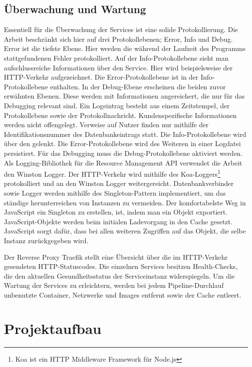 \subsection{Überwachung und Wartung}
\label{subsec:ueberwachungundwartung}
Essentiell für die Überwachung der Services ist eine solide Protokollierung.
Die Arbeit beschränkt sich hier auf drei Protokollebenen; Error, Info und Debug.
Error ist die tiefste Ebene. Hier werden die während der Laufzeit des Programms
stattgefundenen Fehler protokolliert. Auf der Info-Protokollebene sieht man
aufschlussreiche Informationen über den Service. Hier wird beispielsweise
der HTTP-Verkehr aufgezeichnet. Die Error-Protokollebene ist in der Info-Protokollebene
enthalten. In der Debug-Ebene erscheinen die beiden zuvor erwähnten Ebenen. Diese
werden mit Informationen angereichert, die nur für das Debugging relevant sind.
Ein Logeintrag besteht aus einem Zeitstempel, der Protokollebene sowie der Protokollnachricht.
Kundenspezifische Informationen werden nicht offengelegt. Verweise auf Nutzer finden nur
mithilfe der Identifikationsnummer des Datenbankeintrags statt. Die Info-Protokollebene
wird über den  gelenkt. Die Error-Protokollebene wird des Weiteren in einer
Logdatei persistiert. Für das Debugging muss die Debug-Protokollebene aktiviert werden.
Als Logging-Bibliothek für die Resource Management API verwendet die Arbeit den Winston
Logger. Der HTTP-Verkehr wird mithilfe des Koa-Loggers\footnote{Koa ist ein HTTP Middleware Framework für Node.js} protokolliert und an den Winston
Logger weitergereicht. Datenbankverbinder sowie Logger werden mithilfe des Singleton-Pattern
implementiert, um das ständige herunterreichen von Instanzen zu vermeiden. Der komfortabelste
Weg in JavaScript ein Singleton zu erstellen, ist, indem man ein Objekt exportiert. JavaScript-Objekte
werden beim initialen Ladevorgang in den Cache gesetzt. JavaScript sorgt dafür,
dass bei allen weiteren Zugriffen auf das Objekt, die selbe Instanz zurückgegeben wird.\cite{NodeJsCaching}

Der Reverse Proxy Traefik stellt eine Übersicht über die im HTTP-Verkehr gesendeten 
HTTP-Statuscodes. Die einzelnen Services besitzen Health-Checks, die den aktuellen
Gesundheitsstatus der Serviceinstanz widerspiegeln. Um die Wartung der Services zu erleichtern,
werden bei jedem Pipeline-Durchlauf unbenutzte Container, Netzwerke und Images
entfernt sowie der Cache entleert.

\section{Projektaufbau}
\label{:sec:projektaufbau}

